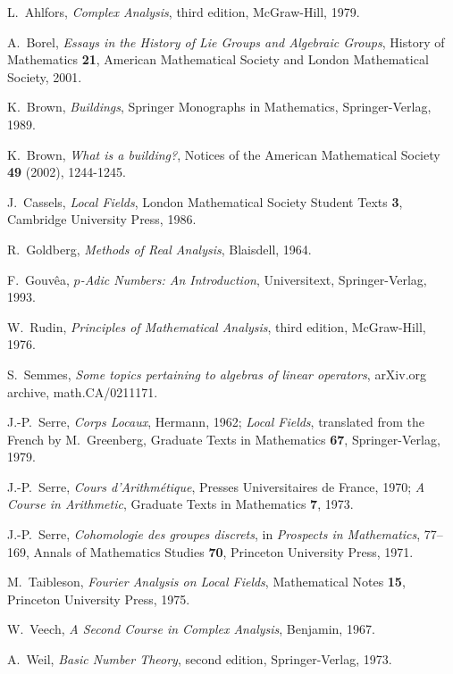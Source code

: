 \documentclass[12pt,leqno,draft]{article}
\begin{document}
\begin{thebibliography}{99}



 L.~Ahlfors, {\it Complex Analysis}, third edition,
McGraw-Hill, 1979.

 A.~Borel, {\it Essays in the History of Lie Groups
and Algebraic Groups}, History of Mathematics {\bf 21}, American
Mathematical Society and London Mathematical Society, 2001.

 K.~Brown, {\it Buildings}, Springer Monographs in
Mathematics, Springer-Verlag, 1989.

 K.~Brown, {\it What is a building?}, Notices of the
American Mathematical Society {\bf 49} (2002), 1244-1245.

 J.~Cassels, {\it Local Fields}, London Mathematical
Society Student Texts {\bf 3}, Cambridge University Press, 1986.

 R.~Goldberg, {\it Methods of Real Analysis},
Blaisdell, 1964.

 F.~Gouv\^ea, {\it $p$-Adic Numbers: An Introduction},
Universitext, Springer-Verlag, 1993.

 W.~Rudin, {\it Principles of Mathematical Analysis},
third edition, McGraw-Hill, 1976.

 S.~Semmes, {\it Some topics pertaining to algebras of
linear operators}, arXiv.org archive, math.CA/0211171.

 J.-P.~Serre, {\it Corps Locaux}, Hermann, 1962;
{\it Local Fields}, translated from the French by M.~Greenberg, Graduate
Texts in Mathematics {\bf 67}, Springer-Verlag, 1979.

 J.-P.~Serre, {\it Cours d'Arithm\'etique}, Presses
Universitaires de France, 1970; {\it A Course in Arithmetic}, Graduate
Texts in Mathematics {\bf 7}, 1973.

 J.-P.~Serre, {\it Cohomologie des groupes discrets},
in {\it Prospects in Mathematics}, 77--169, Annals of Mathematics
Studies {\bf 70}, Princeton University Press, 1971.

 M.~Taibleson, {\it Fourier Analysis on Local Fields},
Mathematical Notes {\bf 15}, Princeton University Press, 1975.

 W.~Veech, {\it A Second Course in Complex Analysis},
Benjamin, 1967.

 A.~Weil, {\it Basic Number Theory}, second edition,
Springer-Verlag, 1973.


\end{thebibliography}
\end{document}
